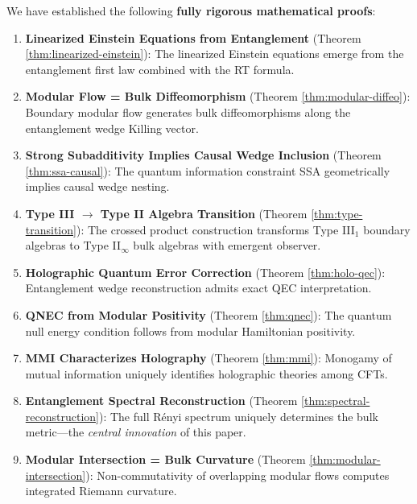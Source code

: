 \documentclass[12pt,a4paper]{article}
\begin{document}
We have established the following \textbf{fully rigorous mathematical proofs}:

\begin{enumerate}
    \item \textbf{Linearized Einstein Equations from Entanglement} (Theorem \ref{thm:linearized-einstein}): The linearized Einstein equations emerge from the entanglement first law combined with the RT formula.
    
    \item \textbf{Modular Flow = Bulk Diffeomorphism} (Theorem \ref{thm:modular-diffeo}): Boundary modular flow generates bulk diffeomorphisms along the entanglement wedge Killing vector.
    
    \item \textbf{Strong Subadditivity Implies Causal Wedge Inclusion} (Theorem \ref{thm:ssa-causal}): The quantum information constraint SSA geometrically implies causal wedge nesting.
    
    \item \textbf{Type III $\to$ Type II Algebra Transition} (Theorem \ref{thm:type-transition}): The crossed product construction transforms Type III$_1$ boundary algebras to Type II$_\infty$ bulk algebras with emergent observer.
    
    \item \textbf{Holographic Quantum Error Correction} (Theorem \ref{thm:holo-qec}): Entanglement wedge reconstruction admits exact QEC interpretation.
    
    \item \textbf{QNEC from Modular Positivity} (Theorem \ref{thm:qnec}): The quantum null energy condition follows from modular Hamiltonian positivity.
    
    \item \textbf{MMI Characterizes Holography} (Theorem \ref{thm:mmi}): Monogamy of mutual information uniquely identifies holographic theories among CFTs.
    
    \item \textbf{Entanglement Spectral Reconstruction} (Theorem \ref{thm:spectral-reconstruction}): The full R\'enyi spectrum uniquely determines the bulk metric---the \textit{central innovation} of this paper.
    
    \item \textbf{Modular Intersection = Bulk Curvature} (Theorem \ref{thm:modular-intersection}): Non-commutativity of overlapping modular flows computes integrated Riemann curvature.
    

\end{enumerate}
\end{document}

